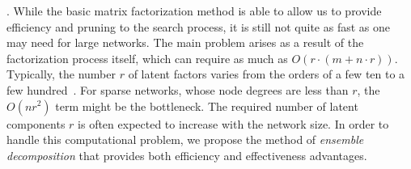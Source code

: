. While the basic matrix factorization method is able to allow us to provide
efficiency and pruning to the search process, it is still not quite
as fast as one may need for large networks. The main problem
arises as a result of the factorization process itself, which can
require as much as $O(r \cdot (m + n\cdot r))$.  Typically, the
number $r$ of latent factors varies from the orders of a few ten to a few hundred~\cite{NMF-nature99, NMF-www2010}. For
sparse networks, whose node degrees are less than $r$, the $O(n
r^2)$ term might be the bottleneck.  The required  number of latent
components $r$ is often expected to increase with the network size. In
order to handle this computational problem, we propose the method of
{\em ensemble decomposition} that provides both efficiency 
and effectiveness advantages.
